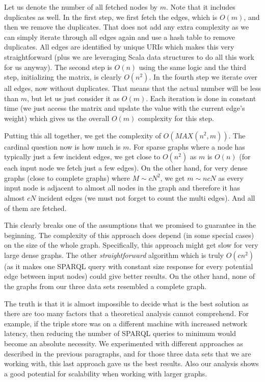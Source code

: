 Let us denote the number of all fetched nodes by $m$. Note that it includes duplicates as well. In the first step, we first fetch the edges, which is $O(m)$, and then we remove the duplicates. That does not add any extra complexity as we can simply iterate through all edges again and use a hash table to remove duplicates. All edges are identified by unique URIs which makes this very straightforward (plus we are leveraging Scala data structures to do all this work for us anyway). The second step is $O(n)$ using the same logic and the third step, initializing the matrix, is clearly $O(n^2)$. In the fourth step we iterate over all edges, now without duplicates. That means that the actual number will be less than $m$, but let us just consider it as $O(m)$. Each iteration is done in constant time (we just access the matrix and update the value with the current edge’s weight) which gives us the overall $O(m)$ complexity for this step.

Putting this all together, we get the complexity of $O(MAX(n^2, m))$. The cardinal question now is how much is $m$. For sparse graphs where a node has typically just a few incident edges, we get close to $O(n^2)$ as $m$ is $O(n)$ (for each input node we fetch just a few edges). On the other hand, for very dense graphs (close to complete graphs) where $M \sim cN^2$, we get $m \sim ncN$ as every input node is adjacent to almost all nodes in the graph and therefore it has almost $cN$ incident edges (we must not forget to count the multi edges). And all of them are fetched.

This clearly breaks one of the assumptions that we promised to guarantee in the beginning. The complexity of this approach does depend (in some special cases) on the size of the whole graph. Specifically, this approach might get slow for very large dense graphs. The other \emph{straightforward} algorithm which is truly $O(cn^2)$ (as it makes one SPARQL query with constant size response for every potential edge between input nodes) could give better results. On the other hand, none of the graphs from our three data sets resembled a complete graph.

The truth is that it is almost impossible to decide what is the best solution as there are too many factors that a theoretical analysis cannot comprehend. For example, if the triple store was on a different machine with increased network latency, then reducing the number of SPARQL queries to minimum would become an absolute necessity. We experimented with different approaches as described in the previous paragraphs, and for those three data sets that we are working with, this last approach gave us the best results. Also our analysis shows a good potential for scalability when working with larger graphs.

